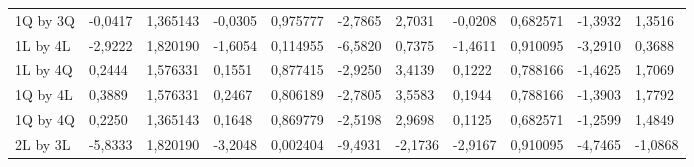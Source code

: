 \begin{table}[H]
{\begin{tabular}{lllllllllll}
\rowcolor[HTML]{FFFFFF} 
{\color[HTML]{000000} 1Q by 3Q}       & {\color[HTML]{000000} -0,0417}  & {\color[HTML]{000000} 1,365143} & {\color[HTML]{000000} -0,0305}  & {\color[HTML]{000000} 0,975777} & {\color[HTML]{000000} -2,7865}        & {\color[HTML]{000000} 2,7031}         & {\color[HTML]{000000} -0,0208}  & {\color[HTML]{000000} 0,682571}      & {\color[HTML]{000000} -1,3932}        & {\color[HTML]{000000} 1,3516}         \\
\rowcolor[HTML]{FFFFFF} 
{\color[HTML]{000000} 1L by 4L}       & {\color[HTML]{000000} -2,9222}  & {\color[HTML]{000000} 1,820190} & {\color[HTML]{000000} -1,6054}  & {\color[HTML]{000000} 0,114955} & {\color[HTML]{000000} -6,5820}        & {\color[HTML]{000000} 0,7375}         & {\color[HTML]{000000} -1,4611}  & {\color[HTML]{000000} 0,910095}      & {\color[HTML]{000000} -3,2910}        & {\color[HTML]{000000} 0,3688}         \\
\rowcolor[HTML]{FFFFFF} 
{\color[HTML]{000000} 1L by 4Q}       & {\color[HTML]{000000} 0,2444}   & {\color[HTML]{000000} 1,576331} & {\color[HTML]{000000} 0,1551}   & {\color[HTML]{000000} 0,877415} & {\color[HTML]{000000} -2,9250}        & {\color[HTML]{000000} 3,4139}         & {\color[HTML]{000000} 0,1222}   & {\color[HTML]{000000} 0,788166}      & {\color[HTML]{000000} -1,4625}        & {\color[HTML]{000000} 1,7069}         \\
\rowcolor[HTML]{FFFFFF} 
{\color[HTML]{000000} 1Q by 4L}       & {\color[HTML]{000000} 0,3889}   & {\color[HTML]{000000} 1,576331} & {\color[HTML]{000000} 0,2467}   & {\color[HTML]{000000} 0,806189} & {\color[HTML]{000000} -2,7805}        & {\color[HTML]{000000} 3,5583}         & {\color[HTML]{000000} 0,1944}   & {\color[HTML]{000000} 0,788166}      & {\color[HTML]{000000} -1,3903}        & {\color[HTML]{000000} 1,7792}         \\
\rowcolor[HTML]{FFFFFF} 
{\color[HTML]{000000} 1Q by 4Q}       & {\color[HTML]{000000} 0,2250}   & {\color[HTML]{000000} 1,365143} & {\color[HTML]{000000} 0,1648}   & {\color[HTML]{000000} 0,869779} & {\color[HTML]{000000} -2,5198}        & {\color[HTML]{000000} 2,9698}         & {\color[HTML]{000000} 0,1125}   & {\color[HTML]{000000} 0,682571}      & {\color[HTML]{000000} -1,2599}        & {\color[HTML]{000000} 1,4849}         \\
\rowcolor[HTML]{FFFFFF} 
{\color[HTML]{000000} 2L by 3L}       & {\color[HTML]{FF0000} -5,8333}  & {\color[HTML]{FF0000} 1,820190} & {\color[HTML]{FF0000} -3,2048}  & {\color[HTML]{FF0000} 0,002404} & {\color[HTML]{FF0000} -9,4931}        & {\color[HTML]{FF0000} -2,1736}        & {\color[HTML]{FF0000} -2,9167}  & {\color[HTML]{FF0000} 0,910095}      & {\color[HTML]{FF0000} -4,7465}        & {\color[HTML]{FF0000} -1,0868}        \\

\end{tabular}}
\end{table}
